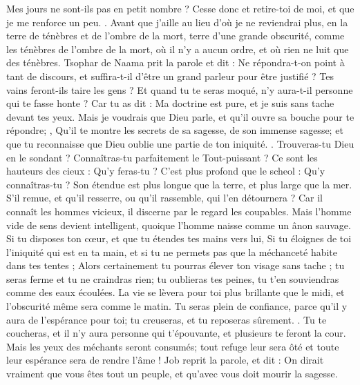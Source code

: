 \begin{multicols}{2}
Mes jours ne sont-ils pas en petit nombre ? Cesse donc et retire-toi de moi, et que je me renforce un peu. .
Avant que j'aille au lieu d'où je ne reviendrai plus, en la terre de ténèbres et de l'ombre de la mort,
terre d'une grande obscurité, comme les ténèbres de l'ombre de la mort, où il n'y a aucun ordre, et où rien ne luit que des ténèbres. 
\VerseOne{}Tsophar de Naama prit la parole et dit :
Ne répondra-t-on point à tant de discours, et suffira-t-il d'être un grand parleur pour être justifié ?
Tes vains feront-ils taire les gens ? Et quand tu te seras moqué, n'y aura-t-il personne qui te fasse honte ?
Car tu as dit : Ma doctrine est pure, et je suis sans tache devant tes yeux. 
Mais je voudrais que Dieu parle, et qu'il ouvre sa bouche pour te répondre; ,
Qu'il te montre les secrets de sa sagesse, de son immense sagesse; et que tu reconnaisse que Dieu oublie une partie de ton iniquité. .
Trouveras-tu Dieu en le sondant ? Connaîtras-tu parfaitement le Tout-puissant ? 
Ce sont les hauteurs des cieux : Qu'y feras-tu ? C'est plus profond que le scheol : Qu'y connaîtras-tu ?
Son étendue est plus longue que la terre, et plus large que la mer.
S'il remue, et qu'il resserre, ou qu'il rassemble, qui l'en détournera ?
Car il connaît les hommes vicieux, il discerne par le regard les coupables.
Mais l'homme vide de sens devient intelligent, quoique l'homme naisse comme un ânon sauvage.
Si tu disposes ton cœur, et que tu étendes tes mains vers lui,
Si tu éloignes de toi l'iniquité qui est en ta main, et si tu ne permets pas que la méchanceté habite dans tes tentes ; 
Alors certainement tu pourras élever ton visage sans tache ; tu seras ferme et tu ne craindras rien;
tu oublieras tes peines, tu t'en souviendras comme des eaux écoulées.
La vie se lèvera pour toi plus brillante que le midi, et l'obscurité même sera comme le matin.
 Tu seras plein de confiance, parce qu'il y aura de l'espérance pour toi; tu creuseras, et tu reposeras sûrement. .
Tu te coucheras, et il n'y aura personne qui t'épouvante, et plusieurs te feront la cour. 
Mais les yeux des méchants seront consumés; tout refuge leur sera ôté et toute leur espérance sera de rendre l'âme !
\VerseOne{}Job reprit la parole, et dit :
On dirait vraiment que vous êtes tout un peuple, et qu'avec vous doit mourir la sagesse.

\end{multicols}
